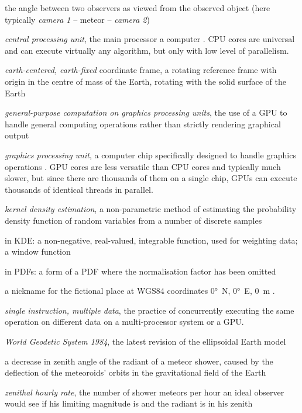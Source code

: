 \begin{description}[labelindent=0mm, leftmargin=40mm]
    \item[convergence angle]
        the angle between two observers as viewed from the observed object (here typically \emph{camera 1} -- meteor -- \emph{camera 2})
    \item[CPU]
        \emph{central processing unit}, the main processor a computer \citep{techterms}.
        CPU cores are universal and can execute virtually any algorithm, but only with low level of parallelism.
    \item[ECEF]
        \emph{earth-centered, earth-fixed} coordinate frame, a rotating reference frame with origin
        in the centre of mass of the Earth, rotating with the solid surface of the Earth
    \item[GPGPU]
        \emph{general-purpose computation on graphics processing units},
        the use of a GPU to handle general computing operations rather than strictly rendering graphical output \citep{techterms}
    \item[GPU]
        \emph{graphics processing unit}, a computer chip specifically designed to handle graphics operations \citep{techterms}.
        GPU cores are less versatile than CPU cores and typically much slower, but since there are thousands of them on a single chip,
        GPUs can execute thousands of identical threads in parallel.
    \item[KDE]
        \emph{kernel density estimation}, a non-parametric method of estimating the probability density function
        of random variables from a number of discrete samples
    \item[kernel]
        in KDE: a non-negative, real-valued, integrable function, used for weighting data; a window function
    \item[kernel]
        in PDFs: a form of a PDF where the normalisation factor has been omitted
    \item[Null Island]
        a nickname for the fictional place at WGS84 coordinates \ang{0}~N, \ang{0}~E, \SI{0}{\metre} \citep{null-island}.
    \item[SIMD]
        \emph{single instruction, multiple data}, the practice of concurrently executing the same operation on
        different data on a multi-processor system or a GPU.
    \item[WGS84]
        \emph{World Geodetic System 1984}, the latest revision of the ellipsoidal Earth model \citep{nima-wgs84}
    \item[zenith attraction]
        a decrease in zenith angle of the radiant of a meteor shower, caused by the deflection of the meteoroids' orbits in the
        gravitational field of the Earth \citep{lovell1954}
    \item[ZHR]
        \emph{zenithal hourly rate}, the number of shower meteors per hour an ideal observer would see
            if his limiting magnitude is  and the radiant is in his zenith \citep{imo-glossary}
\end{description}
